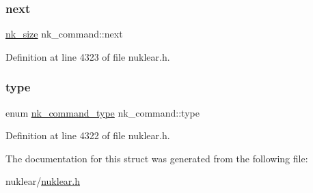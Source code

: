 \subsubsection{\texorpdfstring{next}{next}}
{\footnotesize\ttfamily \mbox{\hyperlink{nuklear_8h_a84c0fc50dec5501be327b33d41d9010c}{nk\+\_\+size}} nk\+\_\+command\+::next}



Definition at line 4323 of file nuklear.\+h.

\mbox{\label{structnk__command_a0bd82809bee01cfb621f9ebcabd050b5}} 
\subsubsection{\texorpdfstring{type}{type}}
{\footnotesize\ttfamily enum \mbox{\hyperlink{nuklear_8h_ac22c9697f5a0310b11c61832f62accda}{nk\+\_\+command\+\_\+type}} nk\+\_\+command\+::type}



Definition at line 4322 of file nuklear.\+h.



The documentation for this struct was generated from the following file\+:\begin{DoxyCompactItemize}
\item 
nuklear/\mbox{\hyperlink{nuklear_8h}{nuklear.\+h}}\end{DoxyCompactItemize}
